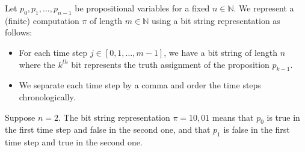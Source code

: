 \documentclass[runningheads]{llncs}
\begin{document}

\begin{definition}
Let $p_0, p_1, ..., p_{n-1}$ be propositional variables for a fixed $n \in \mathbb{N}$. We represent a (finite) computation $\pi$ of length $m \in \mathbb{N}$ using a bit string representation as follows:
\begin{itemize}
    \item For each time step $j \in [0,1,\hdots,m-1]$, we have a bit string of length $n$ where the $k^{th}$ bit represents the truth assignment of the proposition $p_{k-1}$.
    \item We separate each time step by a comma and order the time steps chronologically.
\end{itemize}
\end{definition}


\begin{example}
Suppose $n=2$. The bit string representation $\pi = 10, 01$ means that $p_0$ is true in the first time step and false in the second one, and that $p_1$ is false in the first time step and true in the second one.
\end{example}
\end{document}
